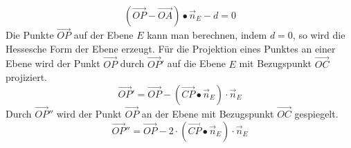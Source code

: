\begin{equation}
\boxed{\left(\overrightarrow{OP}-\overrightarrow{OA}\right)\bullet \overrightarrow{n}_E-d=0}
\end{equation}
Die Punkte $\overrightarrow{OP}$ auf der Ebene $E$ kann man berechnen, indem $d=0$, so wird die Hessesche Form der Ebene erzeugt.
\newline\newline
Für die Projektion eines Punktes an einer Ebene wird der Punkt $\overrightarrow{OP}$ durch $\overrightarrow{OP}'$ auf die Ebene $E$ mit Bezugspunkt $\overrightarrow{OC}$ projiziert.
\begin{equation}
\boxed{\overrightarrow{OP}'=\overrightarrow{OP}-\left(\overrightarrow{CP}\bullet \overrightarrow{n}_E\right)\cdot \overrightarrow{n}_E}
\end{equation}
Durch $\overrightarrow{OP}''$ wird der Punkt $\overrightarrow{OP}$ an der Ebene mit Bezugspunkt $\overrightarrow{OC}$ gespiegelt.
\begin{equation}
\boxed{\overrightarrow{OP}''=\overrightarrow{OP}-2\cdot \left(\overrightarrow{CP}\bullet \overrightarrow{n}_E\right)\cdot \overrightarrow{n}_E}
\end{equation}
